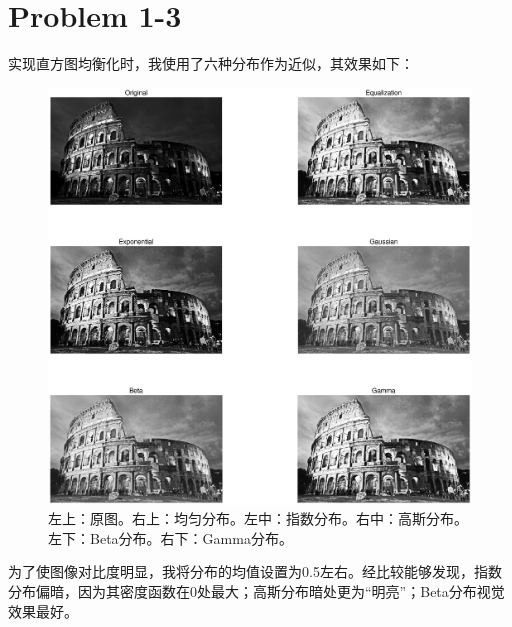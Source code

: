 \documentclass[fontset=macnew]{article}
\begin{document}
\section*{Problem 1-3}
实现直方图均衡化时，我使用了六种分布作为近似，其效果如下：
\begin{figure}[htpb]
	\centering
	\includegraphics[width=\linewidth]{gray.eps}
	\caption{左上：原图。右上：均匀分布。左中：指数分布。右中：高斯分布。\\左下：Beta分布。右下：Gamma分布。}%
	\label{fig:gray}
\end{figure}

为了使图像对比度明显，我将分布的均值设置为0.5左右。经比较能够发现，指数分布偏暗，因为其密度函数在0处最大；高斯分布暗处更为“明亮”；Beta分布视觉效果最好。

\clearpage
\end{document}
